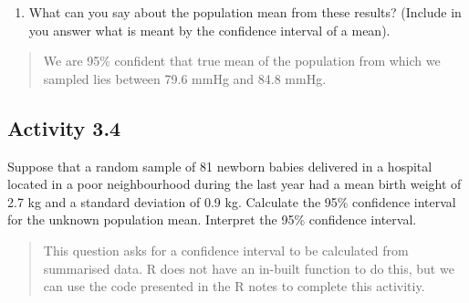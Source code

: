 \documentclass[
]{memoir}
\providecommand{\tightlist}{%
  \setlength{\itemsep}{0pt}\setlength{\parskip}{0pt}}
\begin{document}
\begin{enumerate}
\def\labelenumi{\alph{enumi})}
\setcounter{enumi}{2}
\tightlist
\item
  What can you say about the population mean from these results? (Include in you answer what is meant by the confidence interval of a mean).
\end{enumerate}

\begin{quote}
We are 95\% confident that true mean of the population from which we sampled lies between 79.6 mmHg and 84.8 mmHg.
\end{quote}

\hypertarget{activity-3.4}{%
\subsection*{Activity 3.4}\label{activity-3.4}}

Suppose that a random sample of 81 newborn babies delivered in a hospital located in a poor neighbourhood during the last year had a mean birth weight of 2.7 kg and a standard deviation of 0.9 kg. Calculate the 95\% confidence interval for the unknown population mean. Interpret the 95\% confidence interval.

\begin{quote}
This question asks for a confidence interval to be calculated from summarised data. R does not have an in-built function to do this, but we can use the code presented in the R notes to complete this activitiy.
\end{quote}
\end{document}
